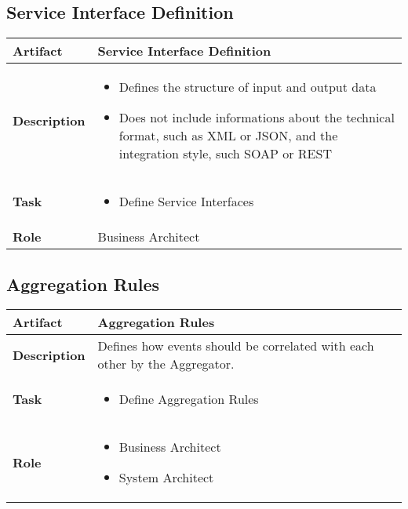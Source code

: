 \subsection{Service Interface Definition}
\begin{tabularx}{\textwidth}{@{} l X @{}}
	\caption{Service Interface Definition} \label{table:ch6_Artifact_Service_Interface_Definition}\\
	\toprule 
	\bfseries Artifact & Service Interface Definition\\
	\midrule 
	\bfseries Description & 
	\begin{itemize}
		\item Defines the structure of input and output data
		\item Does not include informations about the technical format, such as \ac{XML} or \ac{JSON}, and the integration style, such SOAP or \ac{REST}
	\end{itemize}
	\\
	\midrule 
	\bfseries Task & 
	\begin{itemize}
		\item Define Service Interfaces 
	\end{itemize}
	\\
	\midrule 
	\bfseries Role & Business Architect\\
	\bottomrule 
\end{tabularx}

\newpage

\subsection{Aggregation Rules}

\begin{tabularx}{\textwidth}{@{} l X @{}}
	\caption{Aggregation Rules} \label{table:ch6_Artifact_Aggregation_Rules}\\
	\toprule 
	\bfseries Artifact & Aggregation Rules\\
	\midrule 
	\bfseries Description & Defines how events should be correlated with each other by the Aggregator.\\
	\midrule 
	\bfseries Task & 
	\begin{itemize}
		\item Define Aggregation Rules
	\end{itemize}
	\\
	\midrule 
	\bfseries Role & 
	\begin{itemize}
		\item Business Architect
		\item System Architect
	\end{itemize}
	\\
	\bottomrule 
\end{tabularx}


